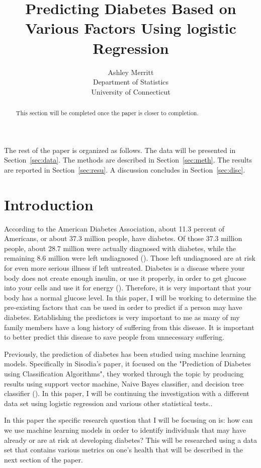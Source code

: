 \documentclass[12pt]{article}
\title{Predicting Diabetes Based on Various Factors Using logistic Regression}
\author{Ashley Merritt\\
    Department of Statistics\\
    University of Connecticut
    }
\begin{document}
\maketitle

\begin{abstract}
This section will be completed once the paper is closer to completion. 
\end{abstract}

The rest of the paper is organized as follows.
The data will be presented in Section~\ref{sec:data}.
The methods are described in Section~\ref{sec:meth}.
The results are reported in Section~\ref{sec:resu}.
A discussion concludes in Section~\ref{sec:disc}.

\section{Introduction}
\label{sec:intro}
    According to the American Diabetes Association, about 11.3 percent of Americans, or about 37.3 million people, have diabetes. Of those 37.3 million people, about 28.7 million were actually diagnosed with diabetes, while the remaining 8.6 million were left undiagnosed (\citet{CDC2022Diabetes}). Those left undiagnosed are at risk for even more serious illness if left untreated. Diabetes is a disease where your body does not create enough insulin, or use it properly, in order to get glucose into your cells and use it for energy (\cite{NIH2023Whatis}). Therefore, it is very important that your body has a normal glucose level. In this paper, I will be working to determine the pre-existing factors that can be used in order to predict if a person may have diabetes. Establishing the predictors is very important to me as many of my family members have a long history of suffering from this disease. It is important to better predict this disease to save people from unnecessary suffering. 

    Previously, the prediction of diabetes has been studied using machine learning models. Specifically in Sisodia's paper, it focused on the "Prediction of Diabetes using Classification Algorithms", they worked through the topic by producing results using support vector machine, Naive Bayes classifier, and decision tree classifier (\cite{Sisodia2018Prediction}). In this paper, I will be continuing the investigation with a different data set using logistic regression and various other statistical tests.. 

    In this paper the specific research question that I will be focusing on is: how can we use machine learning models in order to identify individuals that may have already or are at risk at developing diabetes? This will be researched using a data set that contains various metrics on one's health that will be described in the next section of the paper.
\end{document}
